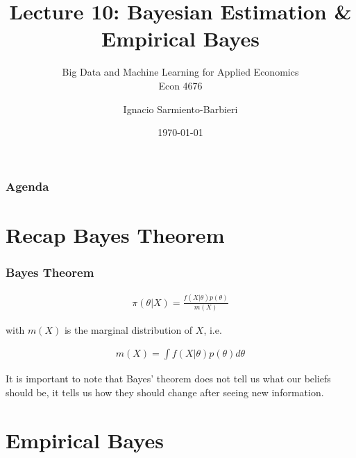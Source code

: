 \documentclass[
  shownotes,
  xcolor={svgnames},
  hyperref={colorlinks,citecolor=DarkBlue,linkcolor=DarkRed,urlcolor=DarkBlue}
  , aspectratio=169]{beamer}
\begin{document}
\title[Lecture 10]{Lecture 10: Bayesian Estimation \& Empirical Bayes}
\subtitle{Big Data and Machine Learning for Applied Economics \\ Econ 4676}
\date{\today}

\author[Sarmiento-Barbieri]{Ignacio Sarmiento-Barbieri}


\begin{frame}[noframenumbering]
\maketitle
\end{frame}




\begin{frame}
\frametitle{Agenda}

\tableofcontents


\end{frame}

\section{Recap Bayes Theorem}
\begin{frame}[fragile]
\frametitle{Bayes Theorem}


\bigskip
\begin{align}
\pi (\theta|X)=\frac{f(X|\theta)p(\theta)}{m(X)}
\end{align}

\bigskip
with $m(X)$ is the marginal distribution of $X$, i.e.

\begin{align}
m(X)=\int f(X|\theta)p(\theta)d\theta
\end{align}

It is important to note that Bayes' theorem  does not tell us what our beliefs should be, it tells us how they should change after seeing new information.
\end{frame}


\section{Empirical Bayes}
\end{document}
